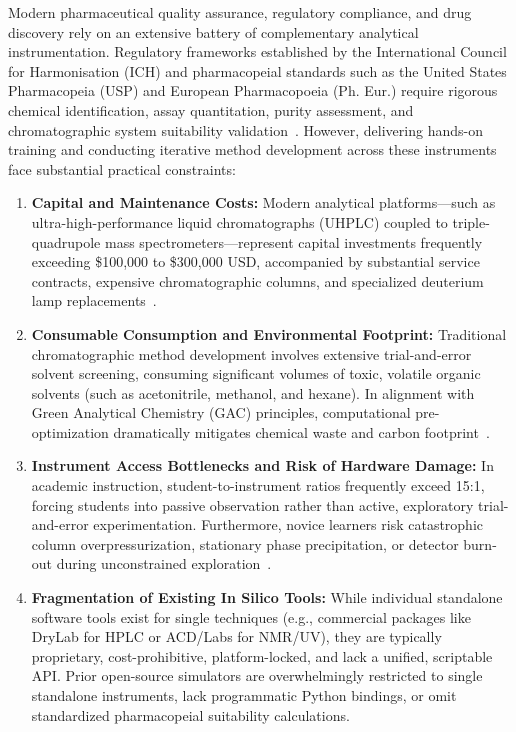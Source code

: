 \documentclass[final,5p,times,twocolumn]{elsarticle}
\begin{document}
Modern pharmaceutical quality assurance, regulatory compliance, and drug discovery rely on an extensive battery of complementary analytical instrumentation. Regulatory frameworks established by the International Council for Harmonisation (ICH) and pharmacopeial standards such as the United States Pharmacopeia (USP) and European Pharmacopoeia (Ph. Eur.) require rigorous chemical identification, assay quantitation, purity assessment, and chromatographic system suitability validation~\cite{ich2005q2,usp2020chapter621}. However, delivering hands-on training and conducting iterative method development across these instruments face substantial practical constraints:

\begin{enumerate}
    \item \textbf{Capital and Maintenance Costs:} Modern analytical platforms---such as ultra-high-performance liquid chromatographs (UHPLC) coupled to triple-quadrupole mass spectrometers---represent capital investments frequently exceeding \$100,000 to \$300,000 USD, accompanied by substantial service contracts, expensive chromatographic columns, and specialized deuterium lamp replacements~\cite{snyder2010modern}.
    \item \textbf{Consumable Consumption and Environmental Footprint:} Traditional chromatographic method development involves extensive trial-and-error solvent screening, consuming significant volumes of toxic, volatile organic solvents (such as acetonitrile, methanol, and hexane). In alignment with Green Analytical Chemistry (GAC) principles, computational pre-optimization dramatically mitigates chemical waste and carbon footprint~\cite{galuszka2013principles}.
    \item \textbf{Instrument Access Bottlenecks and Risk of Hardware Damage:} In academic instruction, student-to-instrument ratios frequently exceed 15:1, forcing students into passive observation rather than active, exploratory trial-and-error experimentation. Furthermore, novice learners risk catastrophic column overpressurization, stationary phase precipitation, or detector burn-out during unconstrained exploration~\cite{bosch2021virtual}.
    \item \textbf{Fragmentation of Existing In Silico Tools:} While individual standalone software tools exist for single techniques (e.g., commercial packages like DryLab for HPLC or ACD/Labs for NMR/UV), they are typically proprietary, cost-prohibitive, platform-locked, and lack a unified, scriptable API. Prior open-source simulators are overwhelmingly restricted to single standalone instruments, lack programmatic Python bindings, or omit standardized pharmacopeial suitability calculations.
\end{enumerate}
\end{document}
